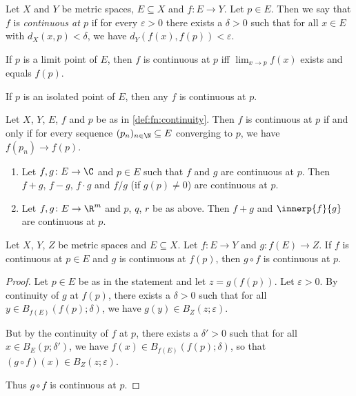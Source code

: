 \begin{definition}[Continuity] \label{def:fn:continuity}
    Let $X$ and $Y$ be metric spaces, $E \subseteq X$ and $f\colon E \to Y$.
    Let $p \in E$.
    Then we say that $f$ is \emph{continuous at $p$} if for every
    $\varepsilon > 0$ there exists a $\delta > 0$ such that for all
    $x \in E$ with $d_X(x, p) < \delta$,
    we have $d_Y(f(x), f(p)) < \varepsilon$.
\end{definition}
\begin{remarks}
    \item If $p$ is a limit point of $E$, then $f$ is continuous at $p$ iff
    $\lim_{x \to p} f(x)$ exists and equals $f(p)$.
    \item If $p$ is an isolated point of $E$,
    then any $f$ is continuous at $p$.
\end{remarks}

\begin{theorem}
\label{thm:fn:continuity:sequential}
    Let $X$, $Y$, $E$, $f$ and $p$ be as in \cref{def:fn:continuity}.
    Then $f$ is continuous at $p$ if and only if for every sequence
    $(p_n)_{n \in \N} \subseteq E$ converging to $p$,
    we have $f(p_n) \to f(p)$.
\end{theorem}
\begin{corollary} \leavevmode
    \begin{enumerate}
        \item Let $f, g\colon E \to \C$ and $p \in E$ such that
        $f$ and $g$ are continuous at $p$.
        Then $f + g$, $f - g$, $f \cdot g$ and $f / g$ (if $g(p) \ne 0$)
        are continuous at $p$.
        \item Let $f, g\colon E \to \R^m$ and $p$, $q$, $r$ be as above.
        Then $f + g$ and $\innerp{f}{g}$ are continuous at $p$.
    \end{enumerate}
\end{corollary}

\begin{exercise*}
\label{thm:fn:continuity:composition}
    Let $X$, $Y$, $Z$ be metric spaces and $E \subseteq X$.
    Let $f\colon E \to Y$ and $g\colon f(E) \to Z$.
    If $f$ is continuous at $p \in E$ and $g$ is continuous at $f(p)$,
    then $g \circ f$ is continuous at $p$.
\end{exercise*}
\begin{proof}
    Let $p \in E$ be as in the statement and let $z = g(f(p))$.
    Let $\varepsilon > 0$.
    By continuity of $g$ at $f(p)$, there exists a $\delta > 0$
    such that for all $y \in B_{f(E)}(f(p); \delta)$,
    we have $g(y) \in B_Z(z; \varepsilon)$.

    But by the continuity of $f$ at $p$, there exists a $\delta' > 0$
    such that for all $x \in B_E(p; \delta')$,
    we have $f(x) \in B_{f(E)}(f(p); \delta)$,
    so that $(g \circ f)(x) \in B_Z(z; \varepsilon)$.

    Thus $g \circ f$ is continuous at $p$.
\end{proof}
